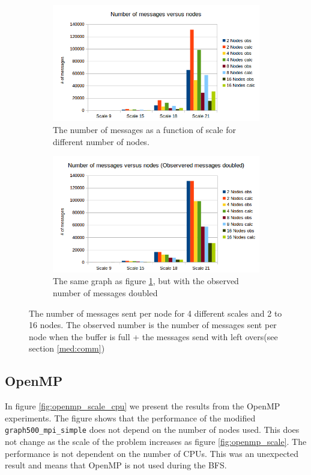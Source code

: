 \begin{figure}[!h]
\centering
\begin{subfigure}{.5\textwidth}
  \centering
  \includegraphics[width=\linewidth]{images/scale_vs_messages.png}
  \caption{The number of messages as a function of scale for different number of nodes.}
  \label{fig:scale_messages}
\end{subfigure}%
\begin{subfigure}{.5\textwidth}
  \centering
  \includegraphics[width=\linewidth]{images/scale_vs_messages_doubled.png}
  \caption{The same graph as figure \ref{fig:scale_messages}, but with the observed number of messages doubled}
  \label{fig:scale_messages_doubled}
\end{subfigure}
\caption{The number of messages sent per node for 4 different scales and 2 to 16 nodes. The observed number is the number of messages sent per node when the buffer is full + the messages send with left overs(see section \ref{med:comm})}
\label{fig:das_scale_messages}
\end{figure}


\subsection{OpenMP}
\label{sec:openmp}
In figure \ref{fig:openmp_scale_cpu} we present the results from the OpenMP experiments. 
The figure shows that the performance of the modified \texttt{graph500\_mpi\_simple} does not depend on the number of nodes used. This does not change as the scale of the problem increases as figure \ref{fig:openmp_scale}. The performance is not dependent on the number of CPUs. This was an unexpected result and means that OpenMP is not used during the BFS.

